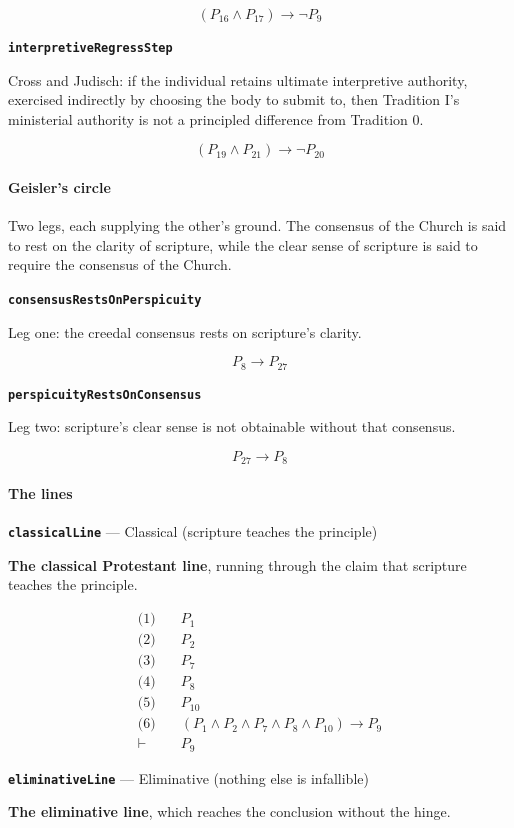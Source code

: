 \documentclass[11pt]{article}
\begin{document}
\[(P_{16} \land P_{17}) \rightarrow \lnot P_{9}\]
\par\medskip\noindent\textbf{\texttt{interpretive\allowbreak{}Regress\allowbreak{}Step}}\par\nobreak\noindent
Cross and Judisch: if the individual retains ultimate interpretive authority, exercised indirectly by choosing the body to submit to, then Tradition I's ministerial authority is not a principled difference from Tradition 0.

\[(P_{19} \land P_{21}) \rightarrow \lnot P_{20}\]
\paragraph*{Geisler's circle}
\leavevmode\par
Two legs, each supplying the other's ground. The consensus of the Church is said to rest on the clarity of scripture, while the clear sense of scripture is said to require the consensus of the Church.

\par\medskip\noindent\textbf{\texttt{consensus\allowbreak{}Rests\allowbreak{}On\allowbreak{}Perspicuity}}\par\nobreak\noindent
Leg one: the creedal consensus rests on scripture's clarity.

\[P_{8} \rightarrow P_{27}\]
\par\medskip\noindent\textbf{\texttt{perspicuity\allowbreak{}Rests\allowbreak{}On\allowbreak{}Consensus}}\par\nobreak\noindent
Leg two: scripture's clear sense is not obtainable without that consensus.

\[P_{27} \rightarrow P_{8}\]
\paragraph*{The lines}
\leavevmode\par
\par\medskip\noindent\textbf{\texttt{classical\allowbreak{}Line}} --- Classical (scripture teaches the principle)\par\nobreak\noindent
\textbf{The classical Protestant line}, running through the claim that scripture teaches the principle.

\begin{align*}
  \text{(1)} \quad & P_{1} \\
  \text{(2)} \quad & P_{2} \\
  \text{(3)} \quad & P_{7} \\
  \text{(4)} \quad & P_{8} \\
  \text{(5)} \quad & P_{10} \\
  \text{(6)} \quad & (P_{1} \land P_{2} \land P_{7} \land P_{8} \land P_{10}) \rightarrow P_{9} \\
  \vdash \quad & P_{9}
\end{align*}
\par\medskip\noindent\textbf{\texttt{eliminative\allowbreak{}Line}} --- Eliminative (nothing else is infallible)\par\nobreak\noindent
\textbf{The eliminative line}, which reaches the conclusion without the hinge.
\end{document}
